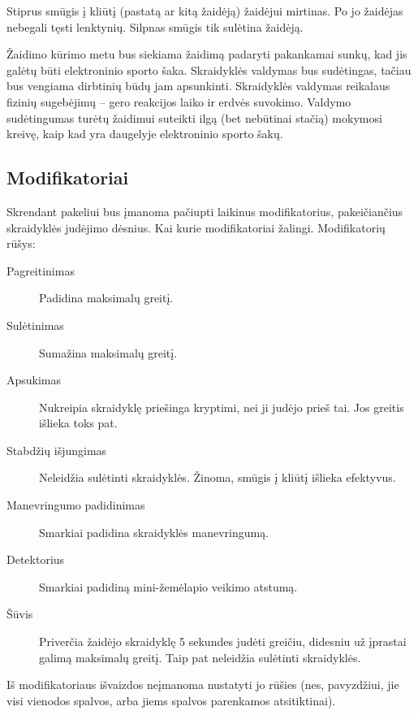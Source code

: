 Stiprus smūgis į kliūtį (pastatą ar kitą žaidėją) žaidėjui mirtinas.
Po jo žaidėjas nebegali tęsti lenktynių.
Silpnas smūgis tik sulėtina žaidėją.

Žaidimo kūrimo metu bus siekiama žaidimą padaryti pakankamai sunkų, kad jis galėtų būti elektroninio sporto šaka.
Skraidyklės valdymas bus sudėtingas, tačiau bus vengiama dirbtinių būdų jam apsunkinti.
Skraidyklės valdymas reikalaus fizinių sugebėjimų -- gero reakcijos laiko ir erdvės suvokimo.
Valdymo sudėtingumas turėtų žaidimui suteikti ilgą (bet nebūtinai stačią) mokymosi kreivę, kaip kad yra daugelyje elektroninio sporto šakų.

\subsection{Modifikatoriai}

Skrendant pakeliui bus įmanoma pačiupti laikinus modifikatorius, pakeičiančius skraidyklės judėjimo dėsnius.
Kai kurie modifikatoriai žalingi.
Modifikatorių rūšys:
\begin{description}
\item[Pagreitinimas]
    Padidina maksimalų greitį.
\item[Sulėtinimas]
    Sumažina maksimalų greitį.
\item[Apsukimas]
    Nukreipia skraidyklę priešinga kryptimi, nei ji judėjo prieš tai.
    Jos greitis išlieka toks pat.
\item[Stabdžių išjungimas]
    Neleidžia sulėtinti skraidyklės.
    Žinoma, smūgis į kliūtį išlieka efektyvus.
\item[Manevringumo padidinimas]
    Smarkiai padidina skraidyklės manevringumą.
\item[Detektorius]
    Smarkiai padidiną mini-žemėlapio veikimo atstumą.
\item[Šūvis]
    Priverčia žaidėjo skraidyklę 5 sekundes judėti greičiu, didesniu už įprastai galimą maksimalų greitį.
    Taip pat neleidžia sulėtinti skraidyklės.
\end{description}
Iš modifikatoriaus išvaizdos neįmanoma nustatyti jo rūšies (nes, pavyzdžiui, jie visi vienodos spalvos, arba jiems spalvos parenkamos atsitiktinai).
